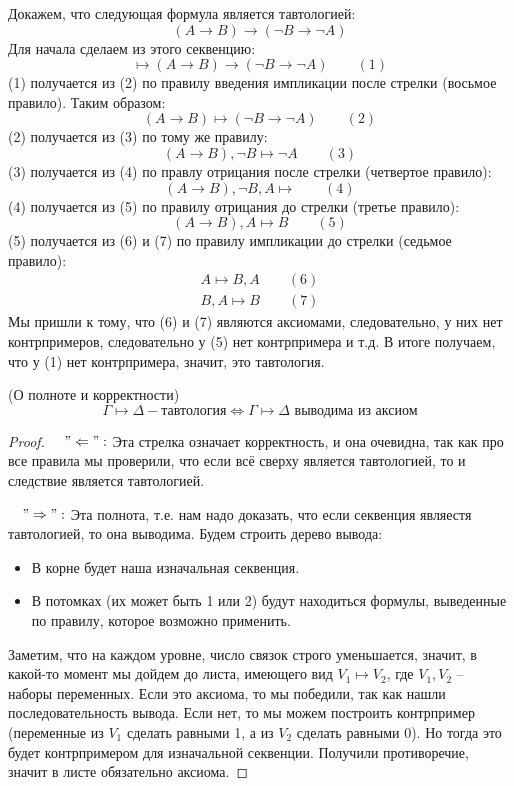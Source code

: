 \begin{example}
    Докажем, что следующая формула является тавтологией: \[ (A \to B) \to (\neg B \to \neg A) \]
    Для начала сделаем из этого секвенцию: \[ \mapsto (A \to B) \to (\neg B \to \neg A) \quad\quad (1) \]
    (1) получается из (2) по правилу введения импликации после стрелки (восьмое правило). Таким образом: \[ (A \to B) \mapsto  (\neg B \to \neg A) \quad\quad (2) \]
    (2) получается из (3) по тому же правилу: \[ (A \to B), \neg B \mapsto  \neg A \quad\quad (3) \]
    (3) получается из (4) по правлу отрицания после стрелки (четвертое правило): \[ (A \to B), \neg B, A \mapsto  \quad\quad (4) \]
    (4) получается из (5) по правилу отрицания до стрелки (третье правило): \[ (A \to B), A \mapsto B \quad\quad (5) \]
    (5) получается из (6) и (7) по правилу импликации до стрелки (седьмое правило): \begin{gather*}
        A \mapsto B, A \quad\quad (6) \\
        B, A \mapsto B \quad\quad (7)
    \end{gather*}
    Мы пришли к тому, что (6) и (7) являются аксиомами, следовательно, у них нет контрпримеров, следовательно у (5) нет контрпримера и т.д. В итоге получаем, что у (1) нет контрпримера, значит, это тавтология.

    \begin{theorem}
        (О полноте и корректности) \[ \Gamma \mapsto \Delta - \text{тавтология} \Longleftrightarrow \Gamma \mapsto \Delta \text{ выводима из аксиом} \]
    \end{theorem}
    \begin{proof}
        \quad

        $\quad "\Leftarrow":$ Эта стрелка означает корректность, и она очевидна, так как про все правила мы проверили, что если всё сверху является тавтологией, то и следствие является тавтологией.

        $\quad "\Rightarrow":$ Эта полнота, т.е. нам надо доказать, что если секвенция являестя тавтологией, то она выводима.
        Будем строить дерево вывода: \begin{itemize}
            \item В корне будет наша изначальная секвенция.
            \item В потомках (их может быть 1 или 2) будут находиться формулы, выведенные по правилу, которое возможно применить.
        \end{itemize}
        \quad Заметим, что на каждом уровне, число связок строго уменьшается, значит, в какой-то момент мы дойдем до листа, имеющего вид $V_1 \mapsto V_2$, где $V_1, V_2$ -- наборы переменных. Если это аксиома, то мы победили, так как нашли последовательность вывода. Если нет, то мы можем построить контрпример (переменные из $V_1$ сделать равными 1, а из $V_2$ сделать равными 0). Но тогда это будет контрпримером для изначальной секвенции. Получили противоречие, значит в листе обязательно аксиома.
    \end{proof}
\end{example}


